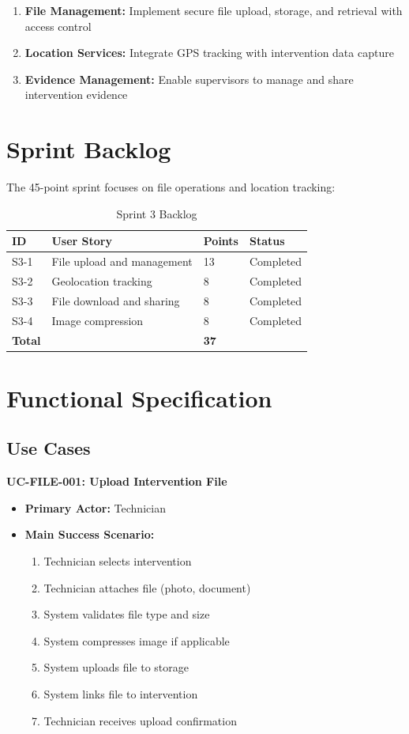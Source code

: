\begin{enumerate}
\item \textbf{File Management:} Implement secure file upload, storage, and retrieval with access control
\item \textbf{Location Services:} Integrate GPS tracking with intervention data capture
\item \textbf{Evidence Management:} Enable supervisors to manage and share intervention evidence
\end{enumerate}

\section{Sprint Backlog}

The 45-point sprint focuses on file operations and location tracking:

\begin{table}[H]
\centering
\caption{Sprint 3 Backlog}
\label{tab:sprint3_backlog}
\begin{tabularx}{\textwidth}{|l|X|l|l|}
\hline
\textbf{ID} & \textbf{User Story} & \textbf{Points} & \textbf{Status} \\
\hline
S3-1 & File upload and management & 13 & Completed \\
\hline
S3-2 & Geolocation tracking & 8 & Completed \\
\hline
S3-3 & File download and sharing & 8 & Completed \\
\hline
S3-4 & Image compression & 8 & Completed \\
\hline
\textbf{Total} & & \textbf{37} & \\
\hline
\end{tabularx}
\end{table}

\section{Functional Specification}

\subsection{Use Cases}

\textbf{UC-FILE-001: Upload Intervention File}
\begin{itemize}
\item \textbf{Primary Actor:} Technician
\item \textbf{Main Success Scenario:}
  \begin{enumerate}
  \item Technician selects intervention
  \item Technician attaches file (photo, document)
  \item System validates file type and size
  \item System compresses image if applicable
  \item System uploads file to storage
  \item System links file to intervention
  \item Technician receives upload confirmation
  \end{enumerate}
\end{itemize}

